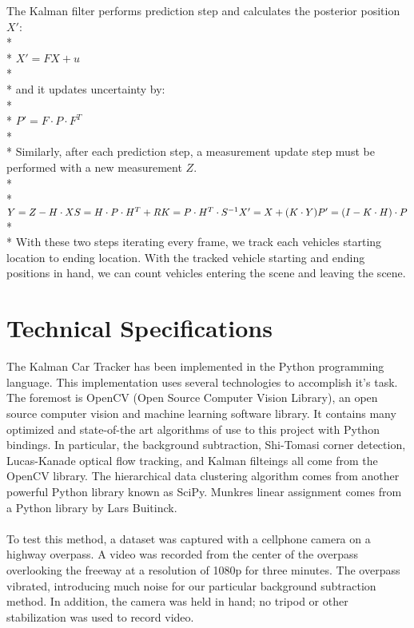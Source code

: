 \documentclass[draft]{article} %
\begin{document}
The Kalman filter performs prediction step and calculates the posterior position $X'$:\\*\\* 
$X' = FX+u$\\*\\*
and it updates uncertainty by:\\*\\*
$P' = F \cdot P \cdot F^T$\\*\\*
Similarly, after each prediction step, a measurement update step must be performed with a new measurement $Z$.\\*\\*
$Y = Z - H \cdot X\\*
 S = H \cdot P \cdot H^T + R\\*
 K = P \cdot H^T \cdot S^{-1} \\*
 X' = X + (K\cdot Y)\\*
 P' = (I - K \cdot H) \cdot P $\\*\\*
 With these two steps iterating every frame, we track each vehicles starting location to ending location. With the tracked vehicle starting and ending positions in hand, we can count vehicles entering the scene and leaving the scene.
\section{Technical Specifications}
\label{headings}

The Kalman Car Tracker has been implemented in the Python programming language. This implementation uses several technologies to accomplish it's task. The foremost is OpenCV (Open Source Computer Vision Library), an open source computer vision and machine learning software library. It contains many optimized and state-of-the art algorithms of use to this project with Python bindings. In particular, the background subtraction, Shi-Tomasi corner detection, Lucas-Kanade optical flow tracking, and Kalman filteings all come from the OpenCV library. The hierarchical data clustering algorithm comes from another powerful Python library known as SciPy. Munkres linear assignment comes from a Python library by Lars Buitinck.
\paragraph{}To test this method, a dataset was captured with a cellphone camera on a highway overpass. A video was recorded from the center of the overpass overlooking the freeway at a resolution of 1080p for three minutes. The overpass vibrated, introducing much noise for our particular background subtraction method. In addition, the camera was held in hand; no tripod or other stabilization was used to record video.
\end{document}
